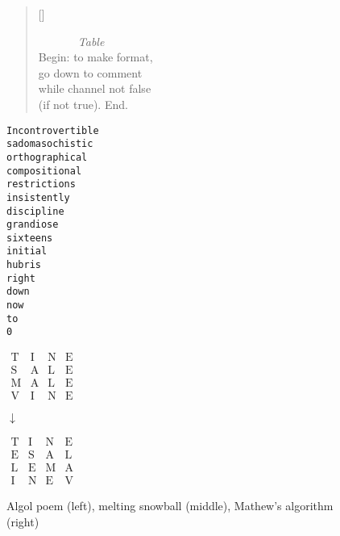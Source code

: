 \begin{figure}[!htbp]
\begin{minipage}{.42\linewidth}
  \settowidth{\versewidth}{while channel not false} 
  \begin{verse}[\versewidth]
  \begin{patverse}\ttfamily
    ~~~~~~~\textit{Table}\\
    Begin: to make format,\\
    go down to comment\\
    while channel not false\\
      (if not true). End.\\ 
  \end{patverse}
  \end{verse}
\end{minipage}
\begin{minipage}{.32\linewidth}
  \begin{alltt}\ttfamily\centering
    Incontrovertible
    sadomasochistic
    orthographical
    compositional
    restrictions 
    insistently
    discipline
    grandiose
    sixteens
    initial
    hubris
    right
    down
    now
    to
    0
  \end{alltt}
\end{minipage}
\begin{minipage}{.24\linewidth}
  \centering
  $\begin{matrix}
    \text{T}&\text{I}&\text{N}&\text{E}\\
    \text{S}&\text{A}&\text{L}&\text{E}\\
    \text{M}&\text{A}&\text{L}&\text{E}\\
    \text{V}&\text{I}&\text{N}&\text{E}
  \end{matrix}$

  \vspace{5mm}

  $\downarrow$

  \vspace{5mm}

  $\begin{matrix}
    \text{T}&\text{I}&\text{N}&\text{E}\\
    \text{E}&\text{S}&\text{A}&\text{L}\\
    \text{L}&\text{E}&\text{M}&\text{A}\\
    \text{I}&\text{N}&\text{E}&\text{V}
  \end{matrix}$
\end{minipage}
\caption[Algol poem, melting snowball, Mathew's algorithm]{Algol poem (left), melting snowball (middle), Mathew's algorithm (right)}
\label{fig:poems}
\end{figure}

